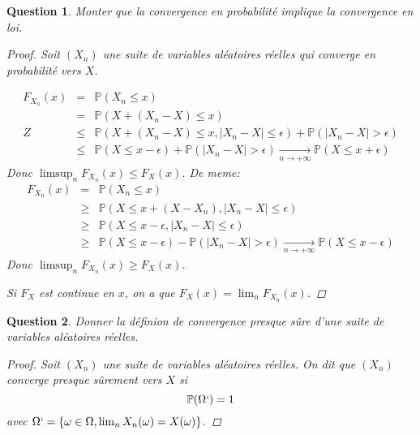 \documentclass{article}
\theoremstyle{plain}
\newtheorem{question}{Question}
\theoremstyle{definition}
\begin{document}
\begin{question}
	Monter que la convergence en probabilité implique la convergence en loi.
	\begin{proof}
		Soit $(X_n)$ une suite de variables aléatoires réelles qui converge en probabilité vers $X$.

		\begin{eqnarray*}
			F_{X_n} (x) &=& \mathbb{P} (X_n \leq x) \\
			&=& \mathbb{P} (X + (X_n - X) \leq x) \\Z
			&\leq& \mathbb{P} (X+(X_n-X) \leq x, |X_n - X| \leq \epsilon) + \mathbb{P} (|X_n - X| > \epsilon) \\
			&\leq& \mathbb{P} (X \leq x - \epsilon) + \mathbb{P} (|X_n - X| > \epsilon) \underset{n\to +\infty}{\longrightarrow} \mathbb{P}(X \leq x + \epsilon)
		\end{eqnarray*}
		Donc $\limsup_n F_{X_n} (x) \leq F_X(x)$.
		De meme:
		\begin{eqnarray*}
			F_{X_n} (x) &=& \mathbb{P} (X_n \leq x) \\
			&\geq& \mathbb{P} (X \leq x + (X-X_n), |X_n - X| \leq \epsilon) \\
			&\geq& \mathbb{P} (X \leq x - \epsilon, |X_n - X| \leq \epsilon) \\
			&\geq& \mathbb{P} (X \leq x - \epsilon) - \mathbb{P} (|X_n - X| > \epsilon)  \underset{n\to +\infty}{\longrightarrow} \mathbb{P}(X \leq x - \epsilon)
		\end{eqnarray*}
		Donc $\limsup_n F_{X_n} (x) \geq F_X(x)$.

		Si $F_X$ est continue en $x$, on a que $F_X(x) = \lim_n F_{X_n} (x)$.
	\end{proof}
\end{question}

\begin{question}
	Donner la définion de convergence presque sûre d'une suite de variables aléatoires réelles.
	\begin{proof}
		Soit $(X_n)$ une suite de variables aléatoires réelles. On dit que $(X_n)$ converge presque sûrement vers $X$ si
		\begin{equation*}
			\mathbb{P} (\Omega`) = 1
		\end{equation*}
		avec $\Omega` = \{\omega \in \Omega, \lim_n X_n (\omega) = X(\omega)\}$.
	\end{proof}
\end{question}
\end{document}

